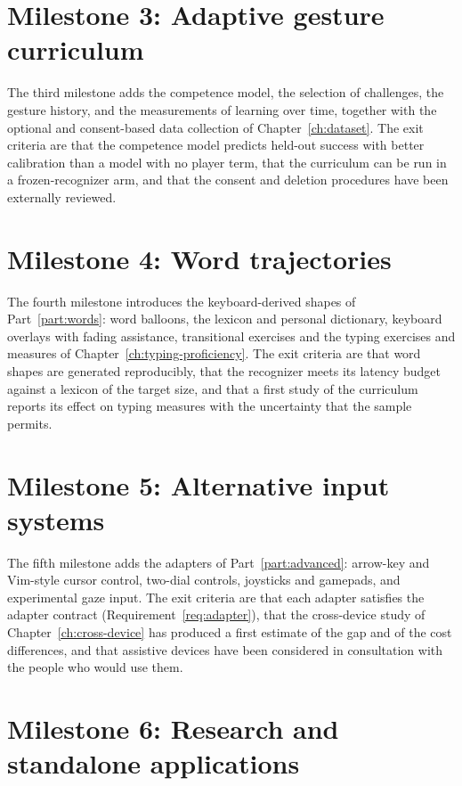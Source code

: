 \section*{Milestone 3: Adaptive gesture curriculum}

The third milestone adds the competence model, the selection of challenges, the gesture history, and the measurements of learning over time, together with the optional and consent-based data collection of Chapter~\ref{ch:dataset}. The exit criteria are that the competence model predicts held-out success with better calibration than a model with no player term, that the curriculum can be run in a frozen-recognizer arm, and that the consent and deletion procedures have been externally reviewed.

\section*{Milestone 4: Word trajectories}

The fourth milestone introduces the keyboard-derived shapes of Part~\ref{part:words}: word balloons, the lexicon and personal dictionary, keyboard overlays with fading assistance, transitional exercises and the typing exercises and measures of Chapter~\ref{ch:typing-proficiency}. The exit criteria are that word shapes are generated reproducibly, that the recognizer meets its latency budget against a lexicon of the target size, and that a first study of the curriculum reports its effect on typing measures with the uncertainty that the sample permits.

\section*{Milestone 5: Alternative input systems}

The fifth milestone adds the adapters of Part~\ref{part:advanced}: arrow-key and Vim-style cursor control, two-dial controls, joysticks and gamepads, and experimental gaze input. The exit criteria are that each adapter satisfies the adapter contract (Requirement~\ref{req:adapter}), that the cross-device study of Chapter~\ref{ch:cross-device} has produced a first estimate of the gap and of the cost differences, and that assistive devices have been considered in consultation with the people who would use them.

\section*{Milestone 6: Research and standalone applications}

